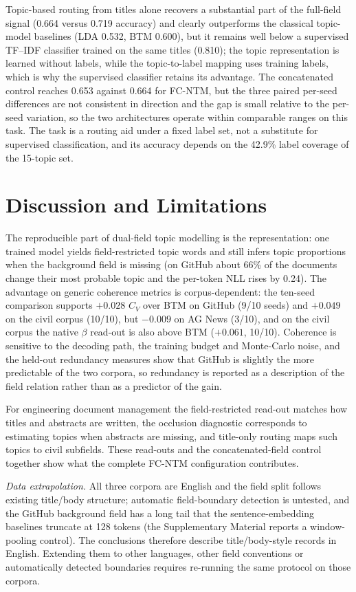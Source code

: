 \documentclass[11pt]{article}
\newcommand{\fcntm}{FC-NTM}
\begin{document}
Topic-based routing from titles alone recovers a substantial part of the full-field signal
(0.664 versus 0.719 accuracy) and clearly outperforms the classical topic-model baselines
(LDA 0.532, BTM 0.600), but it remains well below a supervised TF--IDF classifier trained on the
same titles (0.810); the topic representation is learned without labels, while the topic-to-label
mapping uses training labels, which is why the supervised classifier retains its advantage. The
concatenated control reaches 0.653 against 0.664 for \fcntm{}, but the three paired per-seed
differences are not consistent in direction and the gap is small relative to the per-seed
variation, so the two architectures operate within comparable ranges on this task. The task
is a routing aid under a fixed label set, not a substitute for supervised classification, and
its accuracy depends on the 42.9\% label coverage of the 15-topic set.

\section{Discussion and Limitations}

The reproducible part of dual-field topic modelling is the representation: one trained model
yields field-restricted topic words and still infers topic proportions when the background field is
missing (on GitHub about 66\% of the documents change their most probable topic and the per-token
NLL rises by 0.24). The advantage on generic coherence metrics is corpus-dependent: the ten-seed
comparison supports $+0.028$ $C_V$ over BTM on GitHub (9/10 seeds) and $+0.049$ on the civil corpus
(10/10), but $-0.009$ on AG News (3/10), and on the civil corpus the native $\beta$ read-out is also
above BTM ($+0.061$, 10/10). Coherence is sensitive to the decoding path, the training budget and
Monte-Carlo noise, and the held-out redundancy measures show that GitHub is slightly the more
predictable of the two corpora, so redundancy is reported as a description of the field relation
rather than as a predictor of the gain.

For engineering document management the field-restricted read-out matches how titles and
abstracts are written, the occlusion diagnostic corresponds to estimating topics when abstracts are
missing, and title-only routing maps such topics to civil subfields. These read-outs and the
concatenated-field control together show what the complete \fcntm{} configuration contributes.

\emph{Data extrapolation.} All three corpora are English and the field split follows existing
title/body structure; automatic field-boundary detection is untested, and the GitHub background field
has a long tail that the sentence-embedding baselines truncate at 128 tokens (the Supplementary Material
reports a window-pooling control). The conclusions therefore describe title/body-style records in
English. Extending them to other languages, other field conventions or automatically detected
boundaries requires re-running the same protocol on those corpora.
\end{document}
